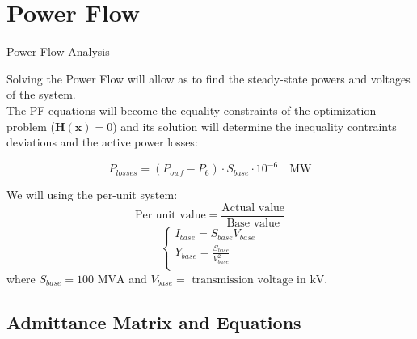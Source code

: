 \section{Power Flow}

\begin{frame}{}
    \tableofcontents[currentsection]
\end{frame}

\begin{frame}{Power Flow Analysis}

Solving the Power Flow will allow as to find the steady-state powers and voltages of the system.\\
The PF equations will become the equality constraints of the optimization problem ($ \mathbf{H(x)} = 0$)
and its solution will determine the inequality contraints deviations and the active power losses:

\begin{equation}
    P_{losses} = (P_{owf} - P_{6}) \cdot S_{base} \cdot 10^{-6} \quad \text{MW}
\end{equation}

We will using the per-unit system:
\begin{equation}
    \text{Per unit value} = \frac{\text{Actual value}}{\text{Base value}}
\end{equation}
\begin{equation}
    \begin{cases}
        I_{base} = S_{base}V_{base} \\
        Y_{base} = \frac{S_{base}}{V_{base}^2} \\
    \end{cases}
\end{equation}
where $S_{base} =100 \text{ MVA}$ and $V_{base} = \text{ transmission voltage in kV}$.

\end{frame}


\subsection{Admittance Matrix and Equations}


